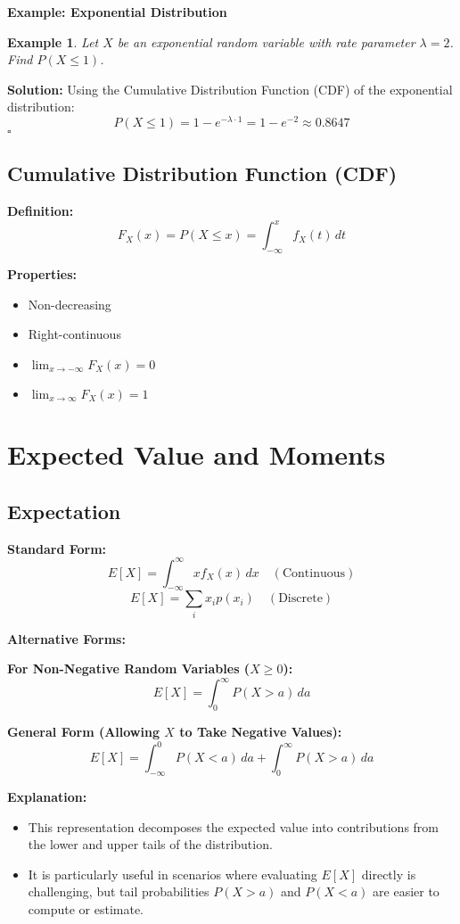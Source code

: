 \documentclass[12pt]{article}
\newtheorem{example}{Example}
\newenvironment{solution}{\noindent\textbf{Solution:}}{\hfill$\square$}
\begin{document}
\textbf{Example: Exponential Distribution}
\begin{example}
Let \( X \) be an exponential random variable with rate parameter \( \lambda = 2 \). Find \( P(X \leq 1) \).
\end{example}
\begin{solution}
Using the Cumulative Distribution Function (CDF) of the exponential distribution:
\[
P(X \leq 1) = 1 - e^{-\lambda \cdot 1} = 1 - e^{-2} \approx 0.8647
\]
\end{solution}

\subsection{Cumulative Distribution Function (CDF)}
\textbf{Definition:}
\[
F_X(x) = P(X \leq x) = \int_{-\infty}^x f_X(t) \, dt
\]

\textbf{Properties:}
\begin{itemize}
    \item Non-decreasing
    \item Right-continuous
    \item \( \lim_{x \to -\infty} F_X(x) = 0 \)
    \item \( \lim_{x \to \infty} F_X(x) = 1 \)
\end{itemize}

\section{Expected Value and Moments}
\subsection{Expectation}
\textbf{Standard Form:}
\[
E[X] = \int_{-\infty}^{\infty} x f_X(x) \, dx \quad (\text{Continuous})
\]
\[
E[X] = \sum_{i} x_i p(x_i) \quad (\text{Discrete})
\]

\textbf{Alternative Forms:}

\textbf{For Non-Negative Random Variables (\( X \geq 0 \)):}
\[
E[X] = \int_0^{\infty} P(X > a) \, da
\]

\textbf{General Form (Allowing \( X \) to Take Negative Values):}
\[
E[X] = \int_{-\infty}^0 P(X < a) \, da + \int_0^{\infty} P(X > a) \, da
\]

\textbf{Explanation:}
\begin{itemize}
    \item This representation decomposes the expected value into contributions from the lower and upper tails of the distribution.
    \item It is particularly useful in scenarios where evaluating \( E[X] \) directly is challenging, but tail probabilities \( P(X > a) \) and \( P(X < a) \) are easier to compute or estimate.
\end{itemize}
\end{document}
